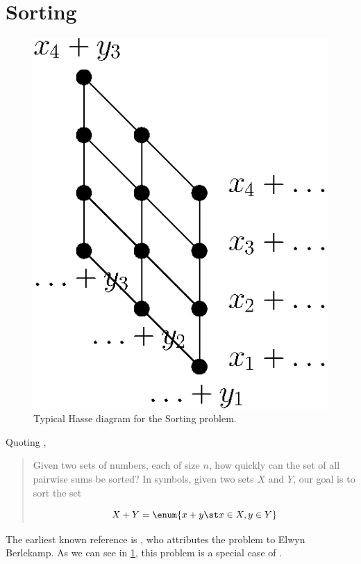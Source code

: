 

\section{Sorting \XY}
\label{tree:open:xy}

\begin{figure}
	\centering
	\includegraphics[height=0.2\textheight]{fig/open/x+y}
	\caption{Typical Hasse diagram for the Sorting \XY problem.}
	\label{fig:open:xy}
\end{figure}

Quoting \cite{orourke:2012:sortxy},

\begin{quotation}
Given two sets of numbers, each of size $n$, how quickly can the set of all
pairwise sums be sorted? In symbols, given two sets $X$ and $Y$, our goal is to
sort the set

$$ X + Y = \enum{x + y \st x \in X, y \in Y} $$

\end{quotation}

The earliest known reference is \citet*{fredman:1976}, who attributes
the problem to Elwyn Berlekamp. As we can see in \ref{fig:open:xy}, this
problem is a special case of .

